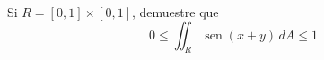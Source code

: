 \item Si $R = [0, 1] \times [0, 1]$, demuestre que
\[ 0 \le \iint_R \operatorname{sen}(x + y) \, dA \le 1 \]

